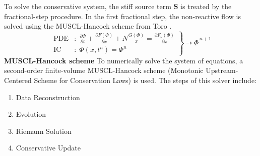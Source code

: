 \documentclass{homework}
\begin{document}
\\ \\ \noindent
To solve the conservative system, the stiff source term $\textbf{S}$ is treated by the fractional-step procedure. In the first fractional step, the non-reactive flow is solved using the MUSCL-Hancock scheme from Toro \cite{Toro2009}.
\begin{equation*}
    \left.
    \begin{aligned}
        \textrm{PDE}&: \; \frac{\partial \Phi}{\partial t} + \frac{\partial F (\Phi)}{\partial x} + N \frac{G (\Phi)}{x} = \frac{\partial F_\nu (\Phi)}{\partial x} \\
        \textrm{IC}&: \; \Phi(x, t^n) = \Phi^n
    \end{aligned}
    \right\} \rightarrowtriangle \overline{\Phi}^{\, n+1}
\end{equation*}
\noindent \textbf{MUSCL-Hancock scheme} To numerically solve the system of equations, a second-order finite-volume MUSCL-Hancock scheme (Monotonic Upstream-Centered Scheme for Conservation Laws) is used. The steps of this solver include:
\begin{enumerate}
    \item Data Reconstruction
    \item Evolution
    \item Riemann Solution
    \item Conservative Update \\
\end{enumerate}
\end{document}
